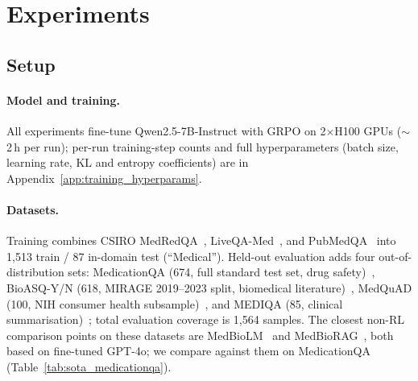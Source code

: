 \documentclass[11pt]{article}
\begin{document}
\section{Experiments}
\label{sec:experiments}

\subsection{Setup}

\paragraph{Model and training.}
All experiments fine-tune Qwen2.5-7B-Instruct with GRPO on 2$\times$H100 GPUs ($\sim$2\,h per run); per-run training-step counts and full hyperparameters (batch size, learning rate, KL and entropy coefficients) are in Appendix~\ref{app:training_hyperparams}.

\paragraph{Datasets.}
Training combines CSIRO MedRedQA~\citep{nguyen2023medredqa},
LiveQA-Med~\citep{liu2020liveqa}, and
PubMedQA~\citep{jin-etal-2019-pubmedqa} into 1{,}513 train /
87 in-domain test (``Medical''). Held-out evaluation adds  four out-of-distribution sets: MedicationQA (674, full standard test set, drug safety)~\citep{liu2020liveqa}, BioASQ-Y/N (618, MIRAGE 2019--2023 split, biomedical literature)~\citep{tsatsaronis2015overview}, MedQuAD (100, NIH consumer health subsample)~\citep{BenAbacha-BMC-2019}, and MEDIQA (85, clinical summarisation)~\citep{xun2025mediqa};  total evaluation coverage is 1{,}564 samples.
The closest non-RL comparison points on these 
datasets are MedBioLM~\citep{kim2025medbiolm} and 
MedBioRAG~\citep{kim2025medbiorag}, both based on 
fine-tuned GPT-4o; we compare against them on 
MedicationQA (Table~\ref{tab:sota_medicationqa}).
\end{document}

